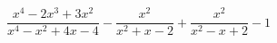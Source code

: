 \begin{ex}[type=expression]
	\begin{condition}
		\(\dfrac{x^4-2x^3+3x^2}{x^4-x^2+4x-4}-\dfrac{x^2}{x^2+x-2}+\dfrac{x^2}{x^2-x+2}-1\)
	\end{condition}
\end{ex}